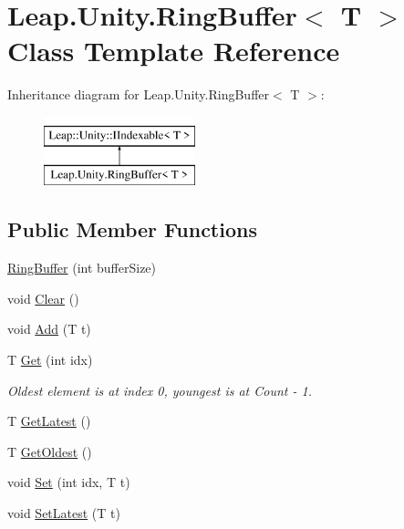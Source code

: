\hypertarget{class_leap_1_1_unity_1_1_ring_buffer}{}\section{Leap.\+Unity.\+Ring\+Buffer$<$ T $>$ Class Template Reference}
\label{class_leap_1_1_unity_1_1_ring_buffer}
Inheritance diagram for Leap.\+Unity.\+Ring\+Buffer$<$ T $>$\+:\begin{figure}[H]
\begin{center}
\leavevmode
\includegraphics[height=2.000000cm]{class_leap_1_1_unity_1_1_ring_buffer}
\end{center}
\end{figure}
\subsection*{Public Member Functions}
\begin{DoxyCompactItemize}
\item 
\mbox{\hyperlink{class_leap_1_1_unity_1_1_ring_buffer_a1c34a2abe28e3cb69969b2d54410df2e}{Ring\+Buffer}} (int buffer\+Size)
\item 
void \mbox{\hyperlink{class_leap_1_1_unity_1_1_ring_buffer_a9b45994f96338d2b8d35b8e0b030953f}{Clear}} ()
\item 
void \mbox{\hyperlink{class_leap_1_1_unity_1_1_ring_buffer_a0f0615cbed9b67fce603552f490beeb4}{Add}} (T t)
\item 
T \mbox{\hyperlink{class_leap_1_1_unity_1_1_ring_buffer_a101894f5bdc4878a0b002a1dff76a450}{Get}} (int idx)
\begin{DoxyCompactList}\small\item\em Oldest element is at index 0, youngest is at Count -\/ 1. \end{DoxyCompactList}\item 
T \mbox{\hyperlink{class_leap_1_1_unity_1_1_ring_buffer_a3a0c08b9bbf58d09f22f8b5cccd7bcb9}{Get\+Latest}} ()
\item 
T \mbox{\hyperlink{class_leap_1_1_unity_1_1_ring_buffer_ad5ba9a1ac565279534e9ff9bf0fcd7a4}{Get\+Oldest}} ()
\item 
void \mbox{\hyperlink{class_leap_1_1_unity_1_1_ring_buffer_afc03c6393eac17fc5c1bbdd5a74eaf52}{Set}} (int idx, T t)
\item 
void \mbox{\hyperlink{class_leap_1_1_unity_1_1_ring_buffer_ad8da49c67d67dbeb3dd311c50901778c}{Set\+Latest}} (T t)
\end{DoxyCompactItemize}
